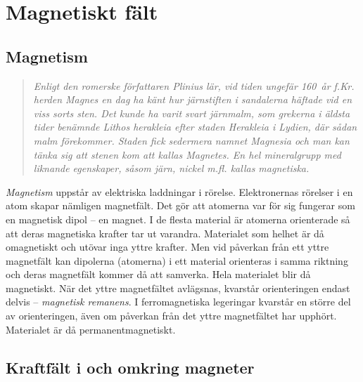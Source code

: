 \section{Magnetiskt fält}
\label{elektromagnetiskafält}

\subsection{Magnetism}

\begin{quote}
\emph{Enligt den romerske författaren \emph{Plinius} lär, vid tiden ungefär
160~år f.Kr. herden \emph{Magnes} en dag ha känt hur järnstiften i
sandalerna häftade vid en viss sorts sten.
Det kunde ha varit svart järnmalm, som grekerna i äldsta tider benämnde
\emph{Lithos herakleia} efter staden \emph{Herakleia} i Lydien,
där sådan malm förekommer.
Staden fick sedermera namnet \emph{Magnesia} och man kan tänka sig att stenen
kom att kallas \emph{Magnetes}.
En hel mineralgrupp med liknande egenskaper, såsom järn, nickel m.fl. kallas
magnetiska.}
\end{quote}

\emph{Magnetism} uppstår av elektriska laddningar i rörelse.
Elektronernas rörelser i en atom skapar nämligen magnetfält.
Det gör att atomerna var för sig fungerar som en magnetisk dipol -- en magnet.
I de flesta material är atomerna orienterade så att deras magnetiska krafter
tar ut varandra.
Materialet som helhet är då omagnetiskt och utövar inga yttre krafter.
Men vid påverkan från ett yttre magnetfält kan dipolerna (atomerna) i ett
material orienteras i samma riktning och deras magnetfält kommer då att
samverka. Hela materialet blir då magnetiskt.
När det yttre magnetfältet avlägsnas, kvarstår orienteringen endast delvis --
\emph{magnetisk remanens}.
I ferromagnetiska legeringar kvarstår en större del av orienteringen, även om
påverkan från det yttre magnetfältet har upphört.
Materialet är då permanentmagnetiskt.


\subsection{Kraftfält i och omkring magneter}


